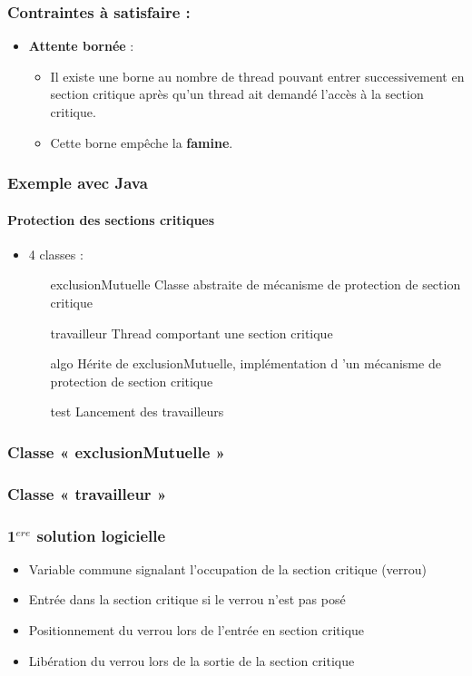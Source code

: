 \begin{frame}
\frametitle{Contraintes à satisfaire :}
\begin{itemize}
\item \textbf{Attente bornée} :
\begin{itemize}
\item Il existe une borne au nombre de thread pouvant entrer successivement en section critique après qu’un thread ait demandé l’accès à la section critique.
\item Cette borne empêche la \textbf{famine}.
\end{itemize}
\end{itemize}
\end{frame}


\begin{frame}
\frametitle{Exemple avec Java}
\framesubtitle{Protection des sections critiques}
\begin{itemize}
\item 4 classes :
\begin{itemize}
\item [exclusionMutuelle] Classe abstraite de mécanisme de protection de section critique
\item [travailleur] Thread comportant une section critique
\item [algo] Hérite de exclusionMutuelle, implémentation d ’un mécanisme de protection de section critique
\item [test] Lancement des travailleurs
\end{itemize}
\end{itemize}
\end{frame}

\begin{frame}
\frametitle{Classe « exclusionMutuelle »}
\begin{scriptsize}\end{scriptsize}
\end{frame}

\begin{frame}
\frametitle{Classe « travailleur »}
\begin{scriptsize}\end{scriptsize}
\end{frame}

\begin{frame}
\frametitle{1$^{ere}$ solution logicielle}
\begin{itemize}
\item Variable commune signalant l’occupation de la section critique (verrou)
\item Entrée dans la section critique si le verrou n’est pas posé
\item Positionnement du verrou lors de l’entrée en section critique
\item Libération du verrou lors de la sortie de la section critique
\end{itemize}
\end{frame}

